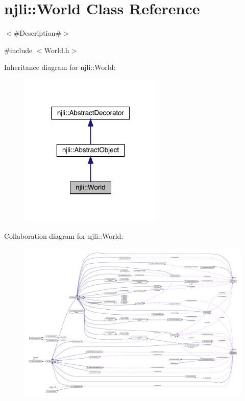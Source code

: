 \hypertarget{classnjli_1_1_world}{}\section{njli\+:\+:World Class Reference}
\label{classnjli_1_1_world}


$<$\#\+Description\#$>$  




{\ttfamily \#include $<$World.\+h$>$}



Inheritance diagram for njli\+:\+:World\+:\nopagebreak
\begin{figure}[H]
\begin{center}
\leavevmode
\includegraphics[width=194pt]{classnjli_1_1_world__inherit__graph}
\end{center}
\end{figure}


Collaboration diagram for njli\+:\+:World\+:\nopagebreak
\begin{figure}[H]
\begin{center}
\leavevmode
\includegraphics[width=350pt]{classnjli_1_1_world__coll__graph}
\end{center}
\end{figure}
